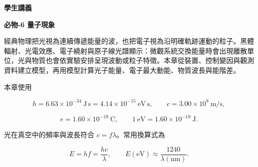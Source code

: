 \documentclass[11pt,a4paper]{article}
\begin{document}
\begin{tcolorbox}[
  enhanced,colback=white,colframe=HandoutBlue,boxrule=1.1pt,arc=2mm,
  borderline west={3pt}{0pt}{HandoutBlue},left=5mm,right=4mm,top=4mm,bottom=4mm
]
{\sffamily\small\bfseries\color{HandoutBlue}學生講義}\par
{\sffamily\bfseries\LARGE\color{HandoutInk}必物-6 量子現象}\par
\vspace{0.35em}{\large 由可量測的光電流、繞射圖樣與光譜線，建立光、物質與原子的量子模型}\par
{}\par
{}\par
\end{tcolorbox}


經典物理把光視為連續傳遞能量的波，也把電子視為沿明確軌跡運動的粒子。黑體輻射、光電效應、電子繞射與原子線光譜顯示：微觀系統交換能量時會出現離散單位，光與物質也會依實驗安排呈現波動或粒子特徵。本章從裝置、控制變因與觀測資料建立模型，再用模型計算光子能量、電子最大動能、物質波長與能階差。

本章使用

\[
h=6.63\times10^{-34}\ \mathrm{J\,s}
=4.14\times10^{-15}\ \mathrm{eV\,s},
\qquad
c=3.00\times10^8\ \mathrm{m/s},
\]

\[
e=1.60\times10^{-19}\ \mathrm C,
\qquad
1\ \mathrm{eV}=1.60\times10^{-19}\ \mathrm J.
\]

光在真空中的頻率與波長符合 \(c=f\lambda\)。常用換算式為

\[
E=hf=\frac{hc}{\lambda},
\qquad
E(\mathrm{eV})\approx \frac{1240}{\lambda(\mathrm{nm})}.
\]
\end{document}
